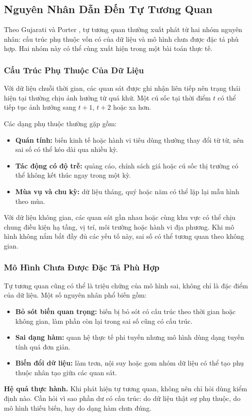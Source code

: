 \subsection{Nguyên Nhân Dẫn Đến Tự Tương Quan}

Theo Gujarati và Porter \cite{gujarati2009}, tự tương quan thường xuất phát từ hai nhóm nguyên nhân: cấu trúc phụ thuộc vốn có của dữ liệu và mô hình chưa được đặc tả phù hợp. Hai nhóm này có thể cùng xuất hiện trong một bài toán thực tế.

\subsubsection{Cấu Trúc Phụ Thuộc Của Dữ Liệu}

Với dữ liệu chuỗi thời gian, các quan sát được ghi nhận liên tiếp nên trạng thái hiện tại thường chịu ảnh hưởng từ quá khứ. Một cú sốc tại thời điểm $t$ có thể tiếp tục ảnh hưởng sang $t+1$, $t+2$ hoặc xa hơn.

Các dạng phụ thuộc thường gặp gồm:
\begin{itemize}
  \item \textbf{Quán tính:} biến kinh tế hoặc hành vi tiêu dùng thường thay đổi từ từ, nên sai số có thể kéo dài qua nhiều kỳ.
  \item \textbf{Tác động có độ trễ:} quảng cáo, chính sách giá hoặc cú sốc thị trường có thể không kết thúc ngay trong một kỳ.
  \item \textbf{Mùa vụ và chu kỳ:} dữ liệu tháng, quý hoặc năm có thể lặp lại mẫu hình theo mùa.
\end{itemize}

Với dữ liệu không gian, các quan sát gần nhau hoặc cùng khu vực có thể chịu chung điều kiện hạ tầng, vị trí, môi trường hoặc hành vi địa phương. Khi mô hình không nắm bắt đầy đủ các yếu tố này, sai số có thể tương quan theo không gian.

\subsubsection{Mô Hình Chưa Được Đặc Tả Phù Hợp}

Tự tương quan cũng có thể là triệu chứng của mô hình sai, không chỉ là đặc điểm của dữ liệu. Một số nguyên nhân phổ biến gồm:
\begin{itemize}
  \item \textbf{Bỏ sót biến quan trọng:} biến bị bỏ sót có cấu trúc theo thời gian hoặc không gian, làm phần còn lại trong sai số cũng có cấu trúc.
  \item \textbf{Sai dạng hàm:} quan hệ thực tế phi tuyến nhưng mô hình dùng dạng tuyến tính quá đơn giản.
  \item \textbf{Biến đổi dữ liệu:} làm trơn, nội suy hoặc gom nhóm dữ liệu có thể tạo phụ thuộc nhân tạo giữa các quan sát.
\end{itemize}

\textbf{Hệ quả thực hành.} Khi phát hiện tự tương quan, không nên chỉ hỏi dùng kiểm định nào. Cần hỏi vì sao phần dư có cấu trúc: do dữ liệu thật sự phụ thuộc, do mô hình thiếu biến, hay do dạng hàm chưa đúng.

